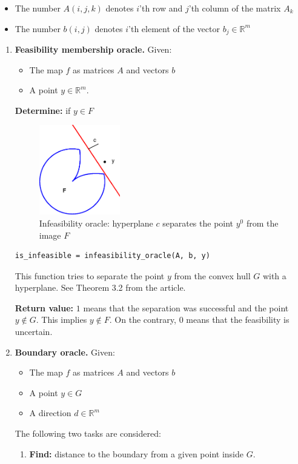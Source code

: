 \documentclass[a4paper]{article}
\newcommand{\R}{\mathbb{R}}
\theoremstyle{definition}
\begin{document}
\begin{itemize}
\item The number $A(i, j, k)$ denotes $i$'th row and $j$'th column of the matrix $A_k$
\item The number $b(i, j)$ denotes $i$'th element of the vector $b_j\in\mathbb{R}^m$
\end{itemize}

\begin{enumerate}
\item {\bf Feasibility membership oracle.} Given:
\begin{itemize}
\item The map $f$ as matrices $A$ and vectors $b$
\item A point $y\in\mathbb{R}^m$.
\end{itemize}
{\bf Determine:} if $y\in F$

\begin{figure}[H]
	\centering\includegraphics[width=100pt]{infeasibility_oracle}
	\caption{Infeasibility oracle: hyperplane $c$ separates the point $y^0$ from the image $F$}
\end{figure}

\begin{verbatim}
is_infeasible = infeasibility_oracle(A, b, y)
\end{verbatim}

This function tries to separate the point $y$ from the convex hull $G$ with a hyperplane. See Theorem 3.2 from the article.

{\bf Return value:} $1$ means that the separation was successful and the point $y\notin G$. This implies $y\notin F$. On the contrary, $0$ means that the feasibility is uncertain.

\item {\bf Boundary oracle.} Given:
\begin{itemize}
	\item The map $f$ as matrices $A$ and vectors $b$
	\item A point $y\in G$
	\item A direction $d\in\R^m$
\end{itemize}
The following two tasks are considered:
\begin{enumerate}
\item {\bf Find:} distance to the boundary from a given point inside $G$.


\end{enumerate}
\end{enumerate}
\end{document}
